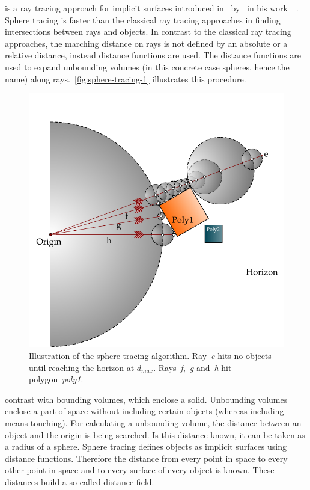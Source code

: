 \documentclass[%
    a4paper,    %
    justified,  %
    nobib,      %
    openany     %
]{tufte-book}
\begin{document}
 is a ray tracing approach for implicit surfaces
introduced in~\citeyear{hart_sphere_1994} by~\citeauthor{hart_sphere_1994} in
his work~~\cite{hart_sphere_1994}. 
Sphere tracing is faster than the classical ray tracing approaches in finding
intersections between rays and objects. In contrast to the classical ray tracing
approaches, the marching distance on rays is not defined by an absolute or a
relative distance, instead distance functions are used. The distance functions
are used to expand unbounding volumes (in this concrete case spheres, hence the
name) along rays.~\autoref{fig:sphere-tracing-1} illustrates this procedure.

\begin{figure}[h]
    \caption{Illustration of the sphere tracing
      algorithm.
      Ray~\textit{e} hits no objects until reaching the horizon at
      $d_{max}$. Rays~\textit{f},~\textit{g} and~\textit{h} hit
      polygon~\textit{poly1}.}
      \label{fig:sphere-tracing-1}
    \centering
    \includegraphics[width=0.75\linewidth]{images/sphere-tracing-principle}
\end{figure}

 contrast with bounding volumes, which enclose a
solid. Unbounding volumes enclose a part of space without including certain
objects (whereas including means touching). For calculating a unbounding volume,
the distance between an object and the origin is being searched. Is this
distance known, it can be taken as a radius of a sphere. Sphere tracing defines
objects as implicit surfaces using distance functions. Therefore the distance
from every point in space to every other point in space and to every surface of
every object is known. These distances build a so called distance field.
\end{document}
